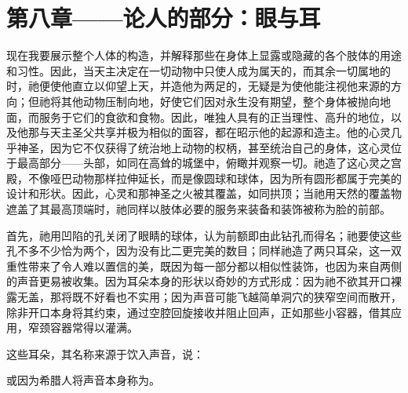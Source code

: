 
\section{第八章——论人的部分：眼与耳}

现在我要展示整个人体的构造，并解释那些在身体上显露或隐藏的各个肢体的用途和习性。因此，当天主决定在一切动物中只使人成为属天的，而其余一切属地的时，祂便使他直立以仰望上天，并造他为两足的，无疑是为使他能注视他来源的方向；但祂将其他动物压制向地，好使它们因对永生没有期望，整个身体被抛向地面，而服务于它们的食欲和食物。因此，唯独人具有的正当理性、高升的地位，以及他那与天主圣父共享并极为相似的面容，都在昭示他的起源和造主。他的心灵几乎神圣，因为它不仅获得了统治地上动物的权柄，甚至统治自己的身体，这心灵位于最高部分——头部，如同在高耸的城堡中，俯瞰并观察一切。祂造了这心灵之宫殿，不像哑巴动物那样拉伸延长，而是像圆球和球体，因为所有圆形都属于完美的设计和形状。因此，心灵和那神圣之火被其覆盖，如同拱顶；当祂用天然的覆盖物遮盖了其最高顶端时，祂同样以肢体必要的服务来装备和装饰被称为脸的前部。\par

首先，祂用凹陷的孔关闭了眼睛的球体，认为前额即由此钻孔而得名；祂要使这些孔不多不少恰为两个，因为没有比二更完美的数目；同样祂造了两只耳朵，这一双重性带来了令人难以置信的美，既因为每一部分都以相似性装饰，也因为来自两侧的声音更易被收集。因为耳朵本身的形状以奇妙的方式形成：因为祂不欲其开口裸露无盖，那将既不好看也不实用；因为声音可能飞越简单洞穴的狭窄空间而散开，除非开口本身将其约束，通过空腔回旋接收并阻止回声，正如那些小容器，借其应用，窄颈容器常得以灌满。\par

这些耳朵，其名称来源于饮入声音，说：\par

\par

或因为希腊人将声音本身称为。\par

